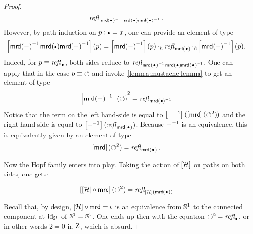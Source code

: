 \documentclass[english,a4]{article}
\renewcommand{\ap}[1]{\left[{#1}\right]}
\begin{document}
\begin{proof}
\begin{displaymath}
    \refl{\inv{\mrd(\base)} \mrd(\base) \inv{\mrd(\base)}}.
  \end{displaymath}
  However, by path induction on $p\from \base = x$, one can provide an
  element of type
  \begin{displaymath}
    \ap{\inv{\mrd(\blank)} \mrd(\base) \inv{\mrd(\blank)}}(p) =
    \ap{\inv{\mrd(\blank)}}(p) \hcomp \refl{\mrd(\base)}
    \hcomp \ap{\inv{\mrd(\blank)}}(p). 
  \end{displaymath}
  Indeed, for $p\jdeq \refl{\base}$, both sides reduce to
  $\refl{\inv{\mrd(\base)} \mrd(\base) \inv{\mrd(\base)}}$. One can
  apply that in the case $p\equiv \mathord{\circlearrowleft}$ and
  invoke~\cref{lemma:mustache-lemma} to get an element of type
  \begin{displaymath}
    {\ap{\inv{\mrd(\blank)}}(\Sloop)}^2 = \refl{\inv{\mrd(\base)}}
  \end{displaymath}
  Notice that the term on the left hand-side is equal to
  $\ap{\inv{\blank}}(\ap\mrd (\Sloop^2))$ and the right hand-side is
  equal to $\ap{\inv{\blank}}(\refl{\mrd(\base)})$. Because
  $\inv{\blank}$ is an equivalence, this is equivalently given by an
  element of type
  \begin{displaymath}
    \ap\mrd(\Sloop^2) = \refl{\mrd(\base)}.
  \end{displaymath}

  Now the Hopf family enters into play. Taking the action of $\ap\hopf$ on
  paths on both sides, one gets:
  
  \begin{displaymath}
    \ap{\ap\hopf\circ \mrd}(\Sloop^2) = \refl{\ap\hopf(\mrd(\base))}
  \end{displaymath}
  
  Recall that, by design, ${\ap\hopf}\circ{\mrd} = \iota$ is an equivalence
  from ${{\mathbb S^{1}}}$ to the connected component at $\mathord{\mathrm{id}}_{{\mathbb S^{1}}}$ of ${{\mathbb S^{1}}}={{\mathbb S^{1}}}$. One ends up
  then with the equation $\Sloop^2 = \refl \base$, or in other words $2=0$ in
  $\mathrm{Z}$, which is absurd.
  
\end{proof}
\end{document}
